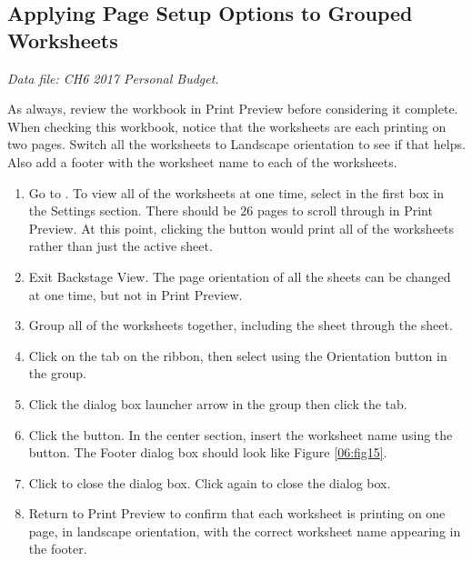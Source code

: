 \subsection{Applying Page Setup Options to Grouped Worksheets}

\textit{Data file: CH6 2017 Personal Budget.}

As always, review the workbook in Print Preview before considering it complete. When checking this workbook, notice that the worksheets are each printing on two pages. Switch all the worksheets to Landscape orientation to see if that helps. Also add a footer with the worksheet name to each of the worksheets.

\begin{enumerate}
	\item Go to . To view all of the worksheets at one time, select  in the first box in the Settings section. There should be $ 26 $ pages to scroll through in Print Preview. At this point, clicking the  button would print all of the worksheets rather than just the active sheet.
	\item Exit Backstage View. The page orientation of all the sheets can be changed at one time, but not in Print Preview.
	\item Group all of the worksheets together, including the  sheet through the  sheet.
	\item Click on the  tab on the ribbon, then select  using the Orientation button in the  group.
	\item Click the  dialog box launcher arrow in the  group then click the  tab.
	\item Click the  button. In the center section, insert the worksheet name using the  button. The Footer dialog box should look like Figure \ref{06:fig15}.
	\item Click  to close the  dialog box. Click  again to close the  dialog box.
	\item Return to Print Preview to confirm that each worksheet is printing on one page, in landscape orientation, with the correct worksheet name appearing in the footer.
\end{enumerate}


